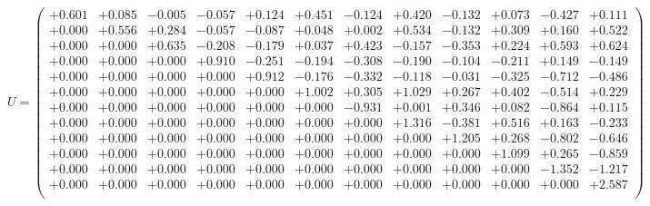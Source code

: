 \documentclass[9pt]{article}
\theoremstyle{plain}
\theoremstyle{definition}
\theoremstyle{remark}
\numberwithin{equation}{section}
\begin{document}
$U = \left(
\begin{array}{
cccccccccccc}
+0.601 & +0.085 & -0.005 & -0.057 & +0.124 & +0.451 & -0.124 & +0.420 & -0.132 & +0.073 & -0.427 & +0.111 \\
+0.000 & +0.556 & +0.284 & -0.057 & -0.087 & +0.048 & +0.002 & +0.534 & -0.132 & +0.309 & +0.160 & +0.522 \\
+0.000 & +0.000 & +0.635 & -0.208 & -0.179 & +0.037 & +0.423 & -0.157 & -0.353 & +0.224 & +0.593 & +0.624 \\
+0.000 & +0.000 & +0.000 & +0.910 & -0.251 & -0.194 & -0.308 & -0.190 & -0.104 & -0.211 & +0.149 & -0.149 \\
+0.000 & +0.000 & +0.000 & +0.000 & +0.912 & -0.176 & -0.332 & -0.118 & -0.031 & -0.325 & -0.712 & -0.486 \\
+0.000 & +0.000 & +0.000 & +0.000 & +0.000 & +1.002 & +0.305 & +1.029 & +0.267 & +0.402 & -0.514 & +0.229 \\
+0.000 & +0.000 & +0.000 & +0.000 & +0.000 & +0.000 & -0.931 & +0.001 & +0.346 & +0.082 & -0.864 & +0.115 \\
+0.000 & +0.000 & +0.000 & +0.000 & +0.000 & +0.000 & +0.000 & +1.316 & -0.381 & +0.516 & +0.163 & -0.233 \\
+0.000 & +0.000 & +0.000 & +0.000 & +0.000 & +0.000 & +0.000 & +0.000 & +1.205 & +0.268 & -0.802 & -0.646 \\
+0.000 & +0.000 & +0.000 & +0.000 & +0.000 & +0.000 & +0.000 & +0.000 & +0.000 & +1.099 & +0.265 & -0.859 \\
+0.000 & +0.000 & +0.000 & +0.000 & +0.000 & +0.000 & +0.000 & +0.000 & +0.000 & +0.000 & -1.352 & -1.217 \\
+0.000 & +0.000 & +0.000 & +0.000 & +0.000 & +0.000 & +0.000 & +0.000 & +0.000 & +0.000 & +0.000 & +2.587 \\
\end{array}
\right)$ \newline 
\end{document}
